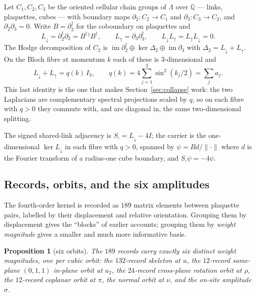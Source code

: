 \documentclass[11pt]{article}
\newtheorem{proposition}[theorem]{Proposition}
\theoremstyle{definition}
\theoremstyle{remark}
\newcommand{\dg}{^{\dagger}}
\newcommand{\Ldn}{L_{\downarrow}}
\newcommand{\Lup}{L_{\uparrow}}
\newcommand{\Ssq}{S_{\square}}
\newcommand{\Q}{\mathbb{Q}}
\newcommand{\chk}[1]{}
\begin{document}
Let $C_1,C_2,C_3$ be the oriented cellular chain groups of $\Lambda$ over
$\Q$ --- links, plaquettes, cubes --- with boundary maps
$\partial_2:C_2\to C_1$ and $\partial_3:C_3\to C_2$, and $\partial_2\partial_3=0$.
Write $B=\partial_2\dg$ for the coboundary on plaquettes and
\begin{equation}\label{eq:laplacians}
  \Ldn=\partial_2\dg\partial_2=B\dg{}\!^{\dagger}\!B\dg,\qquad
  \Lup=\partial_3\partial_3\dg,\qquad \Ldn\Lup=\Lup\Ldn=0 .
\end{equation}
The Hodge decomposition of $C_2$ is
$\operatorname{im}\partial_2\dg\oplus\ker\Delta_2\oplus\operatorname{im}\partial_3$
with $\Delta_2=\Ldn+\Lup$. On the Bloch fibre at momentum $k$ each of these is
$3$-dimensional and
\begin{equation}\label{eq:fibre}
  \Ldn+\Lup=q(k)\,I_3 ,\qquad q(k)=4\sum_{j=1}^{3}\sin^2(k_j/2)=\sum_j a_j .
\end{equation}
This last identity is the one that makes Section~\ref{sec:collapse} work: the
two Laplacians are complementary spectral projections scaled by $q$, so on each
fibre with $q>0$ they commute with, and are diagonal in, the same
two-dimensional splitting.

The signed shared-link adjacency is $\Ssq=\Ldn-4I$; the carrier is the
one-dimensional $\ker\Ldn$ in each fibre with $q>0$, spanned by $\psi=Bd/\|\cdot\|$
where $d$ is the Fourier transform of a radius-one cube boundary, and
$\Ssq\psi=-4\psi$.

\subsection{Records, orbits, and the six amplitudes}\label{sec:orbits}

The fourth-order kernel is recorded as $189$ matrix elements between plaquette
pairs, labelled by their displacement and relative orientation. Grouping them
by displacement gives the ``blocks'' of earlier accounts; grouping them by
\emph{weight magnitude} gives a smaller and much more informative basis.

\begin{proposition}[six orbits]\label{prop:orbits}
The $189$ records carry exactly six distinct weight magnitudes, one per cubic
orbit: the $132$-record skeleton at $u$, the $12$-record same-plane $(0,1,1)$
in-plane orbit at $u_2$, the $24$-record cross-plane rotation orbit at $\rho$,
the $12$-record coplanar orbit at $\pi$, the normal orbit at $\nu$, and the
on-site amplitude $\sigma$.\chk{the 189 records carry exactly six weight magnitudes}
\end{proposition}
\end{document}
